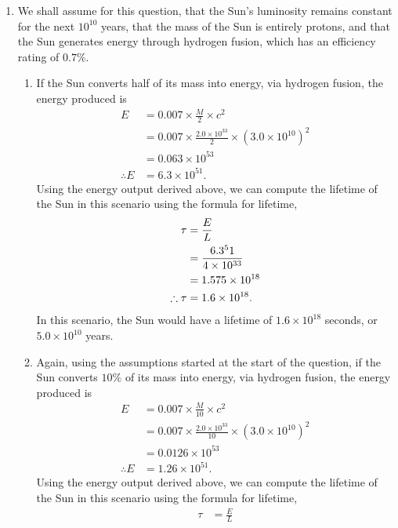 \documentclass[a4paper,11pt]{article}
\newcommand{\ds}{\displaystyle}
\begin{document}
{{\begin{enumerate}[leftmargin=*]
\begin{enumerate}[label=\alph*)]
			\end{enumerate}
			\pagebreak
		\item We shall assume for this question, that the Sun's luminosity remains constant for the next $\ds{10^{10}}$ years, that the mass of the Sun is entirely protons, and that the Sun generates energy through hydrogen fusion, which has an efficiency rating of $\ds{0.7\%}$.
			\begin{enumerate}[label=\alph*)]
			\item If the Sun converts half of its mass into energy, via hydrogen fusion, the energy produced is 
				\begin{align*}
					E & = 0.007\times\frac{M}{2}\times c^2 \\
					  & = 0.007\times \frac{2.0\times 10^33}{2}\times \left(3.0\times 10^{10}\right)^2 \\
					  & = 0.063 \times 10^{53} \\
					\therefore E & = 6.3 \times 10^{51}.
				\end{align*}
				Using the energy output derived above, we can compute the lifetime of the Sun in this scenario using the formula for lifetime, 
				\begin{align*}
					\tau & = \frac{E}{L} \\
						 & = \frac{6.3 \time 10^51}{4\times 10^{33}} \\
						 & = 1.575 \times 10^{18} \\
					\therefore \tau & = 1.6 \times 10^{18}.
				\end{align*}
				In this scenario, the Sun would have a lifetime of $\ds{1.6 \times 10^{18}}$ seconds, or $\ds{5.0\times 10^{10}}$ years.
			\item Again, using the assumptions started at the start of the question, if the Sun converts $\ds{10\%}$ of its mass into energy, via hydrogen fusion, the energy produced is 
				\begin{align*}
					E & = 0.007\times\frac{M}{10}\times c^2 \\
					  & = 0.007\times \frac{2.0\times 10^{33}}{10}\times \left(3.0\times 10^{10}\right)^2 \\
					  & = 0.0126 \times 10^{53} \\
					\therefore E & = 1.26 \times 10^{51}.
				\end{align*}
				Using the energy output derived above, we can compute the lifetime of the Sun in this scenario using the formula for lifetime, 
				\begin{align*}
					\tau & = \frac{E}{L} \\

\end{align*}
\end{enumerate}
\end{enumerate}}}
\end{document}

